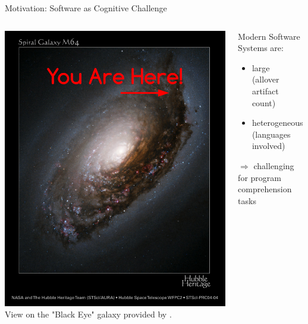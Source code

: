 \documentclass{beamer}
\begin{document}
\begin{frame}{Motivation: Software as Cognitive Challenge}
\begin{columns}
\begin{column}{0.5\textwidth}
\begin{center}
\includegraphics[width=\textwidth]{YouAreHere.png}
\newline
\tiny
View on the "Black Eye" galaxy provided by \cite{BlackEyeGalaxy}.
\end{center}
\end{column}
\begin{column}{0.5\textwidth}
Modern Software Systems are:
\begin{itemize}
\item
large\\(allover artifact count)
\item
heterogeneous\\(languages involved)
\end{itemize}
$\Rightarrow$
challenging for program comprehension tasks 
\end{column}

\end{columns}
\end{frame}
\end{document}
